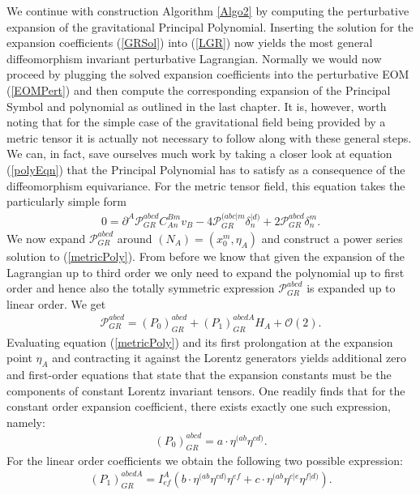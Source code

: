 \documentclass[a4paper,12pt, DIV=14, BCOR=5mm, twoside, headsepline, numbers=noenddot]{scrbook}
\begin{document}
We continue with construction Algorithm \ref{Algo2} by computing the perturbative expansion of the gravitational Principal Polynomial. Inserting the solution for the expansion coefficients (\ref{GRSol}) into (\ref{LGR}) now yields the most general diffeomorphism invariant perturbative Lagrangian. Normally we would now proceed by plugging the solved expansion coefficients into the perturbative EOM (\ref{EOMPert}) and then compute the corresponding expansion of the Principal Symbol and polynomial as outlined in the last chapter. It is, however, worth noting that for the simple case of the gravitational field being provided by a metric tensor it is actually not necessary to follow along with these general steps. We can, in fact, save ourselves much work by taking a closer look at equation (\ref{polyEqn}) that the Principal Polynomial has to satisfy as a consequence of the diffeomorphism equivariance. For the metric tensor field, this equation takes the particularly simple form
\begin{align}\label{metricPoly}
    0 = \partial^A \mathcal{P}_{GR}^{abcd} C_{An}^{Bm} v_B - 4\mathcal{P}_{GR}^{(abc\vert m} \delta_n^{\vert d)} + 2 \mathcal{P}_{GR}^{abcd} \delta^m_n.
\end{align}
We now expand $\mathcal{P}_{GR}^{abcd}$ around $(N_{A}) = (x_0^m, \eta_A)$ and construct a power series solution to (\ref{metricPoly}). From before we know that given the expansion of the Lagrangian up to third order we only need to expand the polynomial up to first order and hence also the totally symmetric expression $\mathcal{P}_{GR}^{abcd}$ is expanded up to linear order. We get 
\begin{align}
    \mathcal{P}_{GR}^{abcd} = (P_0)_{GR}^{abcd} + (P_1)_{GR}^{abcdA} H_A + \mathcal{O}(2).
\end{align}
Evaluating equation (\ref{metricPoly}) and its first prolongation at the expansion point $\eta_A$ and contracting it against the Lorentz generators yields additional zero and first-order equations that state that the expansion constants must be the components of constant Lorentz invariant tensors. One readily finds that for the constant order expansion coefficient, there exists exactly one such expression, namely:
\begin{align}
   (P_0)_{GR}^{abcd} = a \cdot \eta^{(ab} \eta^{cd)}. 
\end{align}
For the linear order coefficients we obtain the following two possible expression:
\begin{align}
    (P_1)_{GR}^{abcdA} = I^A_{ef} \left (b \cdot \eta^{(ab} \eta^{cd)}  \eta^{ef} + c \cdot \eta^{(ab} \eta^{c \vert e} \eta^{f \vert d)} \right ).
\end{align}
\end{document}
